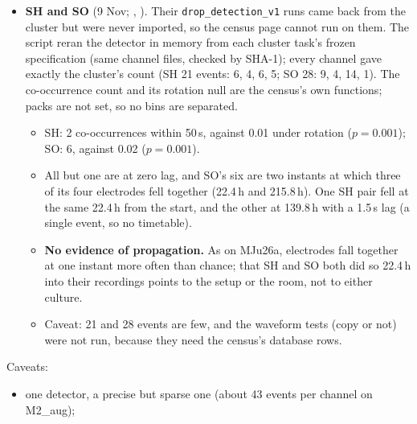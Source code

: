 \begin{instructions}
\begin{itemize}
\begin{itemize}
                recurrences.
          \item The two pairs with a timetable (CH1--CH2, CH1--CH6) co-occur at zero lag ($p=0.23$--0.25 against the
                lag null). The one co-occurrence with a lag (CH3--CH7, 3.5\,s) is a single event.
          \item \textbf{No evidence of propagation.} Channels fire together more often than chance, at the same
                instant. Without packs, a shared driver cannot be told from the setup.
        \end{itemize}
  \item \textbf{SH and SO} (9 Nov; ,
        ). Their \texttt{drop\_detection\_v1} runs came back from
        the cluster but were never imported, so the census page cannot run on them. The script reran the detector in
        memory from each cluster task's frozen specification (same channel files, checked by SHA-1); every channel gave
        exactly the cluster's count (SH 21 events: 6, 4, 6, 5; SO 28: 9, 4, 14, 1). The co-occurrence count and its
        rotation null are the census's own functions; packs are not set, so no bins are separated.
        \begin{itemize}
          \item SH: 2 co-occurrences within 50\,s, against 0.01 under rotation ($p=0.001$); SO: 6, against 0.02
                ($p=0.001$).
          \item All but one are at zero lag, and SO's six are two instants at which three of its four electrodes
                fell together (22.4\,h and 215.8\,h). One SH pair fell at the same 22.4\,h from the start, and the
                other at 139.8\,h with a 1.5\,s lag (a single event, so no timetable).
          \item \textbf{No evidence of propagation.} As on MJu26a, electrodes fall together at one instant more often
                than chance; that SH and SO both did so 22.4\,h into their recordings points to the setup or the room,
                not to either culture.
          \item Caveat: 21 and 28 events are few, and the waveform tests (copy or not) were not run, because they need
                the census's database rows.
        \end{itemize}
\end{itemize}
Caveats:
\begin{itemize}
  \item one detector, a precise but sparse one (about 43 events per channel on M2\_aug);

\end{itemize}
\end{instructions}
